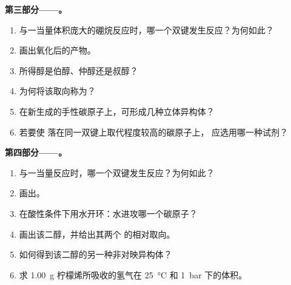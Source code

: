 \begin{problem}
\medskip
\noindent\textbf{第三部分——。}
\begin{enumerate}[resume]
  \item 与一当量体积庞大的硼烷反应时，哪一个双键发生反应？为何如此？
  \item 画出氧化后的产物。
  \item 所得醇是伯醇、仲醇还是叔醇？
  \item 为何将该取向称为？
  \item 在新生成的手性碳原子上，可形成几种立体异构体？
  \item 若要使  落在同一双键上取代程度较高的碳原子上，
        应选用哪一种试剂？
\end{enumerate}

\medskip
\noindent\textbf{第四部分——。}
\begin{enumerate}[resume]
  \item 与一当量反应时，哪一个双键发生反应？为何如此？
  \item 画出。
  \item 在酸性条件下用水开环：水进攻哪一个碳原子？
  \item 画出该二醇，并给出其两个  的相对取向。
  \item 如何得到该二醇的另一种非对映异构体？
  \item 求 \qty{1.00}{g} 柠檬烯所吸收的氢气在
        \qty{25}{\degreeCelsius} 和 \qty{1}{bar} 下的体积。
\end{enumerate}
\end{problem}
